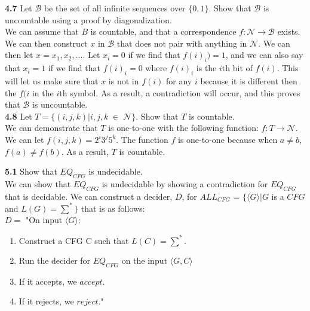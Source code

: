 \documentclass[12pt]{article}
\begin{document}
\pagebreak
\textbf{4.7} Let $\mathcal{B}$ be the set of all infinite sequences over $\{0, 1\}$. 
Show that $\mathcal{B}$ is uncountable using a proof by diagonalization. \\

We can assume that $B$ is countable, and that a correspondence $f:\mathcal{N} \rightarrow \mathcal{B}$
exists. We can then construct $x$ in $\mathcal{B}$ that does not pair with anything in $\mathcal{N}$.
We can then let $x = x_1, x_2, ...$. Let $x_i = 0$ if we find that $f(i)_i) = 1$, and we can also say that
$x_i = 1$ if we find that $f(i)_i = 0$ where $f(i)_i$ is the $i$th bit of $f(i)$. This will let us make
sure that $x$ is not in $f(i)$ for any $i$ because it is different then the $f(i$ in the $i$th symbol.
As a result, a contradiction will occur, and this proves that $\mathcal{B}$ is uncountable. \\

\textbf{4.8} Let $T = \{(i, j, k)| i, j, k \; \in \; \mathcal{N}\}$. Show that $T$ is countable. \\

We can demonstrate that $T$ is one-to-one with the following function:
$f: T \rightarrow \mathcal{N}$. We can let $f(i, j, k) = 2^i 3^j 5^k$. The function
$f$ is one-to-one because when $a \ne b$, $f(a) \ne f(b)$. As a result, $T$ is countable.


\pagebreak
\textbf{5.1} Show that $EQ_{CFG}$ is undecidable. \\

 We can show that $EQ_{CFG}$ is undecidable by showing a contradiction for $EQ_{CFG}$
that is decidable. We can construct a decider, $D$, for $ALL_{CFG}$ = 
$\{ \langle G \rangle | G$ is a $CFG$ and $L(G) = \sum^* \}$ that is as follows: \\

$D = $ "On input $ \langle G \rangle $:
\begin{enumerate}
	\item Construct a CFG C such that $L(C) = \sum^*$.
	\item Run the decider for $EQ_{CFG}$ on the input $ \langle G, C \rangle $
	\item If it accepts, we $accept$.
	\item If it rejects, we $reject$." \\
\end{enumerate}
\end{document}
